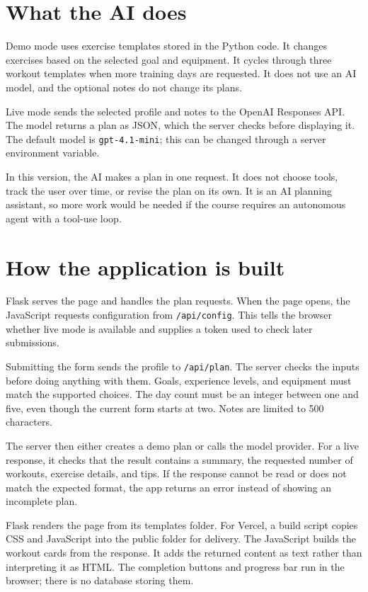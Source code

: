 \documentclass[11pt,letterpaper]{article}
\begin{document}
\section*{What the AI does}
Demo mode uses exercise templates stored in the Python code. It changes exercises based on the selected goal and equipment. It cycles through three workout templates when more training days are requested. It does not use an AI model, and the optional notes do not change its plans.

Live mode sends the selected profile and notes to the OpenAI Responses API. The model returns a plan as JSON, which the server checks before displaying it. The default model is \texttt{gpt-4.1-mini}; this can be changed through a server environment variable.

In this version, the AI makes a plan in one request. It does not choose tools, track the user over time, or revise the plan on its own. It is an AI planning assistant, so more work would be needed if the course requires an autonomous agent with a tool-use loop.

\newpage
\section*{How the application is built}
Flask serves the page and handles the plan requests. When the page opens, the JavaScript requests configuration from \texttt{/api/config}. This tells the browser whether live mode is available and supplies a token used to check later submissions.

Submitting the form sends the profile to \texttt{/api/plan}. The server checks the inputs before doing anything with them. Goals, experience levels, and equipment must match the supported choices. The day count must be an integer between one and five, even though the current form starts at two. Notes are limited to 500 characters.

The server then either creates a demo plan or calls the model provider. For a live response, it checks that the result contains a summary, the requested number of workouts, exercise details, and tips. If the response cannot be read or does not match the expected format, the app returns an error instead of showing an incomplete plan.

Flask renders the page from its templates folder. For Vercel, a build script copies CSS and JavaScript into the public folder for delivery. The JavaScript builds the workout cards from the response. It adds the returned content as text rather than interpreting it as HTML. The completion buttons and progress bar run in the browser; there is no database storing them.
\end{document}
